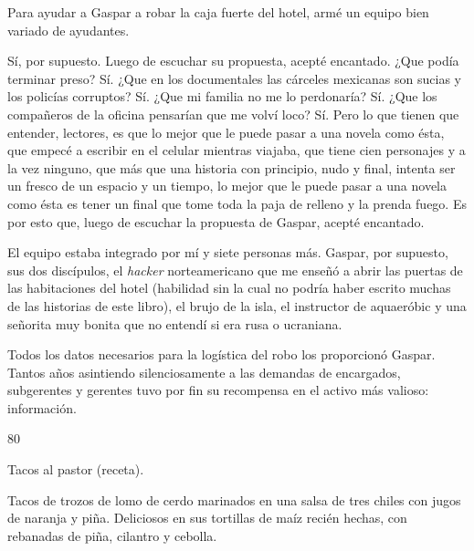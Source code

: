 \documentclass[12pt,twoside,openright,a5paper]{book}
\begin{document}
\nopagebreak

Para ayudar a Gaspar a robar la caja fuerte del hotel, armé un equipo bien
variado de ayudantes.

Sí, por supuesto. Luego de escuchar su propuesta, acepté encantado. ¿Que
podía terminar preso? Sí. ¿Que en los documentales las cárceles
mexicanas son sucias y los policías corruptos? Sí. ¿Que mi familia no
me lo perdonaría? Sí. ¿Que los compañeros de la oficina pensarían que
me volví loco? Sí. Pero lo que tienen que entender, lectores, es que lo
mejor que le puede pasar a una novela como ésta, que empecé a escribir en el
celular mientras viajaba, que tiene cien personajes y a la vez ninguno, que
más que una historia con principio, nudo y final, intenta ser un fresco de
un espacio y un tiempo, lo mejor que le puede pasar a una novela como ésta
es tener un final que tome toda la paja de relleno y la prenda fuego. Es
por esto que, luego de escuchar la propuesta de Gaspar, acepté encantado.

El equipo estaba integrado por mí y siete personas más. Gaspar, por supuesto,
sus dos discípulos, el \emph{hacker} norteamericano que me enseñó a abrir las
puertas de las habitaciones del hotel (habilidad sin la cual no podría
haber escrito muchas de las historias de este libro), el brujo de la isla,
el instructor de aquaeróbic y una señorita muy bonita que no entendí si
era rusa o ucraniana.

Todos los datos necesarios para la logística del robo los proporcionó
Gaspar. Tantos años asintiendo silenciosamente a las demandas de encargados,
subgerentes y gerentes tuvo por fin su recompensa en el activo más valioso:
información.


\vspace{0.5cm}

\hrulefill \hspace{0.1cm}\decofourleft\hspace{0.2cm} 80 \hspace{0.2cm}\decofourright \hspace{0.1cm}\hrulefill

\nopagebreak

\vspace{0.5cm}

\nopagebreak

Tacos al pastor (receta).

Tacos de trozos de lomo de cerdo marinados en una salsa de tres chiles
con jugos de naranja y piña. Deliciosos en sus tortillas de maíz recién
hechas, con rebanadas de piña, cilantro y cebolla.
\end{document}
